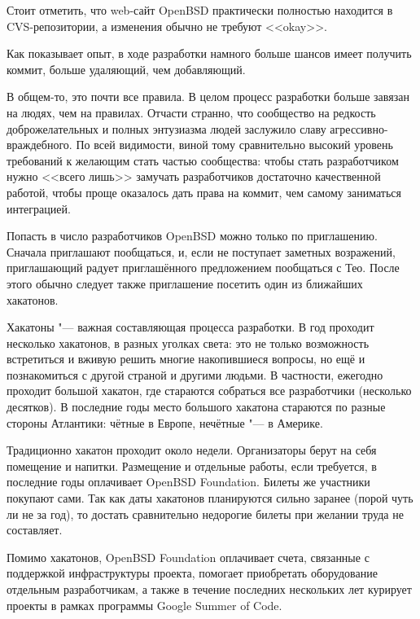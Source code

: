 \documentclass[10pt, a5paper]{article}
\begin{document}
Стоит отметить, что web-сайт OpenBSD практически полностью находится в CVS-репозитории, а изменения обычно не требуют \linebreak<<okay>>.

Как показывает опыт, в ходе разработки намного больше шансов имеет получить коммит, больше удаляющий, чем добавляющий.

В общем-то, это почти все правила. В целом процесс разработки больше завязан на людях, чем на правилах. Отчасти странно, что сообщество на редкость доброжелательных и полных энтузиазма людей заслужило славу агрессивно-враждебного. По всей видимости, виной тому сравнительно высокий уровень требований к желающим стать частью сообщества: чтобы стать разработчиком нужно <<всего лишь>> замучать разработчиков достаточно качественной работой, чтобы проще оказалось дать права на коммит, чем самому заниматься интеграцией.

Попасть в число разработчиков OpenBSD можно только по приглашению. Сначала приглашают пообщаться, и, если не поступает заметных возражений, приглашающий радует приглашённого предложением пообщаться с Тео. После этого обычно следует также приглашение посетить один из ближайших хакатонов.

Хакатоны "--- важная составляющая процесса разработки. В год проходит несколько хакатонов, в разных уголках света: это не только возможность встретиться и вживую решить многие накопившиеся вопросы, но ещё и познакомиться с другой страной и другими людьми. В частности, ежегодно проходит большой хакатон, где стараются собраться все разработчики (несколько десятков). В последние годы место большого хакатона стараются по разные стороны Атлантики: чётные в Европе, нечётные "--- в Америке.

Традиционно хакатон проходит около недели. Организаторы берут на себя помещение и напитки. Размещение и отдельные работы, если требуется, в последние годы оплачивает OpenBSD Foundation. Билеты же участники покупают сами. Так как даты хакатонов планируются сильно заранее (порой чуть ли не за год), то достать сравнительно недорогие билеты при желании труда не составляет.

Помимо хакатонов, OpenBSD Foundation оплачивает счета, связанные с поддержкой инфраструктуры проекта, помогает приобретать оборудование отдельным разработчикам, а также в течение последних нескольких лет курирует проекты в рамках программы Google Summer of Code.
\end{document}
